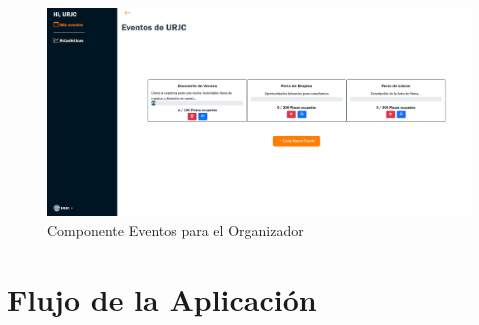 \begin{figure}[h]
    \centering
    \includegraphics[width=1\textwidth]{orgMain.png} 
    \caption{Componente Eventos para el Organizador}
    \label{fig:orgMain}
\end{figure}


\newpage
\section{Flujo de la Aplicación}

